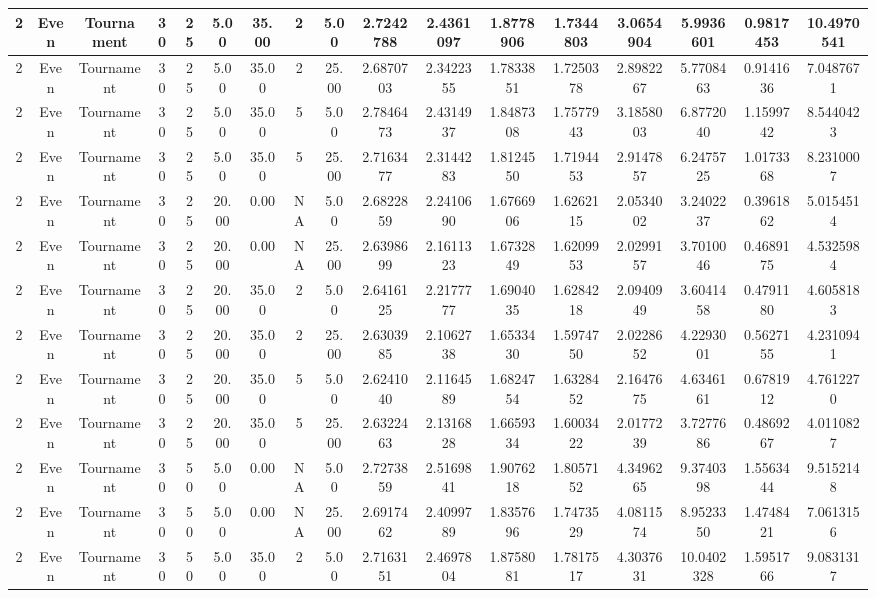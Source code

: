 \begin{longtable}{ | c | c | c | c | c | c | c | c | c | c | c | c | c | c | c | c | c | }
	\hline
	2	&	Even	&	Tournament	&	30	&	25	&	5.00	&	35.00	&	2	&	5.00	&	2.7242788	&	2.4361097	&	1.8778906	&	1.7344803	&	3.0654904	&	5.9936601	&	0.9817453	&	10.4970541 \\
	\hline
	2	&	Even	&	Tournament	&	30	&	25	&	5.00	&	35.00	&	2	&	25.00	&	2.6870703	&	2.3422355	&	1.7833851	&	1.7250378	&	2.8982267	&	5.7708463	&	0.9141636	&	7.0487671 \\
	\hline
	2	&	Even	&	Tournament	&	30	&	25	&	5.00	&	35.00	&	5	&	5.00	&	2.7846473	&	2.4314937	&	1.8487308	&	1.7577943	&	3.1858003	&	6.8772040	&	1.1599742	&	8.5440423 \\
	\hline
	2	&	Even	&	Tournament	&	30	&	25	&	5.00	&	35.00	&	5	&	25.00	&	2.7163477	&	2.3144283	&	1.8124550	&	1.7194453	&	2.9147857	&	6.2475725	&	1.0173368	&	8.2310007 \\
	\hline
	2	&	Even	&	Tournament	&	30	&	25	&	20.00	&	0.00	&	NA	&	5.00	&	2.6822859	&	2.2410690	&	1.6766906	&	1.6262115	&	2.0534002	&	3.2402237	&	0.3961862	&	5.0154514 \\
	\hline
	2	&	Even	&	Tournament	&	30	&	25	&	20.00	&	0.00	&	NA	&	25.00	&	2.6398699	&	2.1611323	&	1.6732849	&	1.6209953	&	2.0299157	&	3.7010046	&	0.4689175	&	4.5325984 \\
	\hline
	2	&	Even	&	Tournament	&	30	&	25	&	20.00	&	35.00	&	2	&	5.00	&	2.6416125	&	2.2177777	&	1.6904035	&	1.6284218	&	2.0940949	&	3.6041458	&	0.4791180	&	4.6058183 \\
	\hline
	2	&	Even	&	Tournament	&	30	&	25	&	20.00	&	35.00	&	2	&	25.00	&	2.6303985	&	2.1062738	&	1.6533430	&	1.5974750	&	2.0228652	&	4.2293001	&	0.5627155	&	4.2310941 \\
	\hline
	2	&	Even	&	Tournament	&	30	&	25	&	20.00	&	35.00	&	5	&	5.00	&	2.6241040	&	2.1164589	&	1.6824754	&	1.6328452	&	2.1647675	&	4.6346161	&	0.6781912	&	4.7612270 \\
	\hline
	2	&	Even	&	Tournament	&	30	&	25	&	20.00	&	35.00	&	5	&	25.00	&	2.6322463	&	2.1316828	&	1.6659334	&	1.6003422	&	2.0177239	&	3.7277686	&	0.4869267	&	4.0110827 \\
	\hline
	2	&	Even	&	Tournament	&	30	&	50	&	5.00	&	0.00	&	NA	&	5.00	&	2.7273859	&	2.5169841	&	1.9076218	&	1.8057152	&	4.3496265	&	9.3740398	&	1.5563444	&	9.5152148 \\
	\hline
	2	&	Even	&	Tournament	&	30	&	50	&	5.00	&	0.00	&	NA	&	25.00	&	2.6917462	&	2.4099789	&	1.8357696	&	1.7473529	&	4.0811574	&	8.9523350	&	1.4748421	&	7.0613156 \\
	\hline
	2	&	Even	&	Tournament	&	30	&	50	&	5.00	&	35.00	&	2	&	5.00	&	2.7163151	&	2.4697804	&	1.8758081	&	1.7817517	&	4.3037631	&	10.0402328	&	1.5951766	&	9.0831317 \\

\end{longtable}
